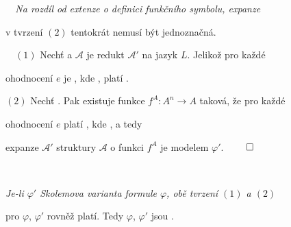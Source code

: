 {\it {}\ \ Na rozdíl od extenze o definici funkčního symbolu, expanze
\smallskip

v tvrzení $(2)$ tentokrát nemusí být jednoznačná.}
\medskip

{\it {}}\ \ $(1)$ Nechť  a $\mathcal{A}$ je redukt $\mathcal{A}'$ na jazyk $L$. Jelikož pro každé
\smallskip

ohodnocení $e$ je , kde , platí .
\smallskip

$(2)$ Nechť . Pak existuje funkce $f^{A}\colon A^n \to A$ taková, že pro každé
\smallskip

ohodnocení $e$ platí , kde , a tedy
\smallskip

expanze $\mathcal{A'}$ struktury $\mathcal{A}$ o funkci $f^{A}$ je modelem $\varphi'$. $\qed$
\medskip

{\bf {}}\ \ {\it Je-li $\varphi'$ Skolemova varianta formule $\varphi$, obě tvrzení $(1)$ a $(2)$
\smallskip

pro $\varphi$, $\varphi'$ rovněž platí. Tedy $\varphi$, $\varphi'$ jsou .}



    
    
    
    
    
    



